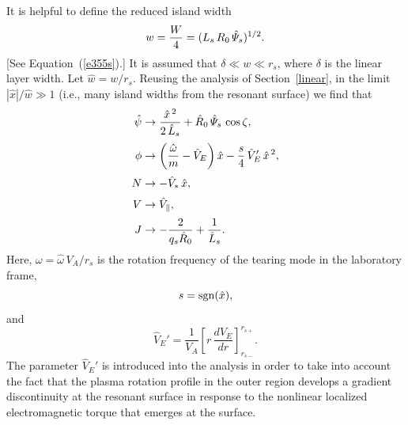 \documentclass[notitlepage,12pt]{article}
\begin{document}
It is helpful to define the reduced island width
\begin{equation}\label{e456}
w = \frac{W}{4} = (L_s\,R_0\,\hat{\mit\Psi}_s)^{1/2}.
\end{equation}
[See Equation~(\ref{e355s}).]
It is assumed that $\delta\ll w\ll r_s$, where $\delta$ is the linear layer width. Let $\hat{w}= w/r_s$.  Reusing the analysis of Section~\ref{linear},
in the limit $|\hat{x}|/\hat{w}\gg 1$ (i.e., many island widths from the resonant surface) we find that 
\begin{align}
\hat{\psi} &\rightarrow \frac{\hat{x}^{\,2}}{2\,\hat{L}_s} + \hat{R}_0\,\hat{\mit\Psi}_s\,\cos\zeta,\\[0.5ex]
\phi &\rightarrow \left(\frac{\hat{\omega}}{m}- \hat{V}_E\right)\hat{x} - \frac{s}{4}\,\hat{V}_E'\,\hat{x}^{\,2},\\[0.5ex]
N &\rightarrow -\hat{V}_\ast\,\hat{x},\\[0.5ex]
V&\rightarrow \hat{V}_\parallel,\\[0.5ex]
J& \rightarrow -\frac{2}{q_s\hat{R}_0} + \frac{1}{\hat{L}_s}.
\end{align}
Here, $\omega = \hat{\omega}\,V_A/r_s$ is the rotation frequency of the tearing mode  in the
laboratory frame,
\begin{equation}
s = {\rm sgn}(\hat{x}),
\end{equation}
and 
\begin{equation}
\hat{V}_E' = \frac{1}{V_A}\left[r\,\frac{dV_E}{dr}\right]_{r_{s-}}^{r_{s+}}.
\end{equation}
The parameter $\hat{V}_E'$ is introduced  into the analysis in order to take into account the fact that the plasma rotation profile in the outer region develops a
gradient discontinuity at the resonant surface in response to the nonlinear localized electromagnetic torque that emerges 
at the surface. 
\end{document}
